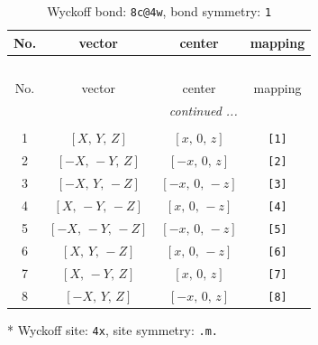 \documentclass[fleqn,8pt]{jsarticle}
\begin{document}
\renewcommand{\arraystretch}{1.2}
\begin{longtable}{cccc}
\caption{Wyckoff bond: {\tt 8c@4w}, bond symmetry: {\tt 1}}
 \\
 \hline \hline
No. & vector & center & mapping \\ \hline \endfirsthead

\multicolumn{3}{l}{\tablename\ \thetable{}} \\
 \hline \hline
No. & vector & center & mapping \\ \hline \endhead

 \hline \hline
\multicolumn{3}{r}{\footnotesize\it continued ...} \\ \endfoot

 \hline \hline
\multicolumn{3}{r}{} \\ \endlastfoot

1 & $\left[ X,\, Y,\, Z \right]$ & $\left[ x,\, 0,\, z \right]$ & {\tt [1]} \\ \hline
2 & $\left[ - X,\, - Y,\, Z \right]$ & $\left[ - x,\, 0,\, z \right]$ & {\tt [2]} \\ \hline
3 & $\left[ - X,\, Y,\, - Z \right]$ & $\left[ - x,\, 0,\, - z \right]$ & {\tt [3]} \\ \hline
4 & $\left[ X,\, - Y,\, - Z \right]$ & $\left[ x,\, 0,\, - z \right]$ & {\tt [4]} \\ \hline
5 & $\left[ - X,\, - Y,\, - Z \right]$ & $\left[ - x,\, 0,\, - z \right]$ & {\tt [5]} \\ \hline
6 & $\left[ X,\, Y,\, - Z \right]$ & $\left[ x,\, 0,\, - z \right]$ & {\tt [6]} \\ \hline
7 & $\left[ X,\, - Y,\, Z \right]$ & $\left[ x,\, 0,\, z \right]$ & {\tt [7]} \\ \hline
8 & $\left[ - X,\, Y,\, Z \right]$ & $\left[ - x,\, 0,\, z \right]$ & {\tt [8]} \\
\end{longtable}
* Wyckoff site: {\tt 4x}, site symmetry: {\tt .m.}
\renewcommand{\arraystretch}{1.2}
\end{document}
